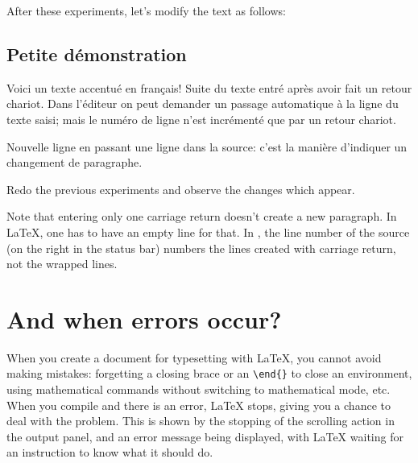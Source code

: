 
After these experiments, let's modify the text as follows:
\begin{example}

\maketitle
\tableofcontents

\section{Petite démonstration}

Voici un texte accentué en français!
Suite du texte entré après avoir fait un retour chariot. Dans
l'éditeur on peut demander un passage automatique à la ligne
du texte saisi; mais le numéro de ligne n'est incrémenté que par un
retour chariot.

Nouvelle ligne en passant une ligne dans la source: c'est la
manière d'indiquer un changement de paragraphe.


\end{example}
Redo the previous experiments and observe the changes which appear.

Note that entering only one carriage return doesn't create a new paragraph. In {\LaTeX}, one has to have an empty line for that. In {\Tw}, the line number of the source (on the right in the status bar) numbers the lines created with carriage return, not the wrapped lines.

\section{And when errors occur?}

When you create a document for typesetting with {\LaTeX}, you cannot avoid making mistakes: forgetting a closing brace or an \verb|\end{}| to close an environment, using mathematical commands without switching to mathematical mode, etc. When you compile and there is an error, {\LaTeX} stops, giving you a chance to deal with the problem. This is shown by the stopping of the scrolling action in the output panel, and an error message being displayed, with {\LaTeX} waiting for an instruction to know what it should do.

